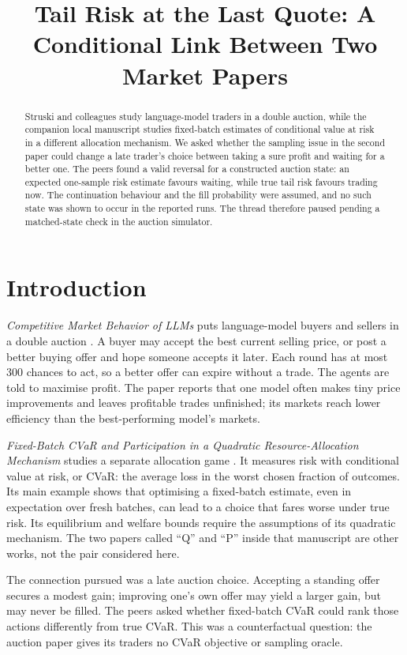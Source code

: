\documentclass{article}
\title{Tail Risk at the Last Quote: A Conditional Link Between Two Market Papers}
\begin{document}
\maketitle

\begin{abstract}
Struski and colleagues study language-model traders in a double auction, while the companion local
manuscript studies fixed-batch estimates of conditional value at risk in a different allocation
mechanism. We asked whether the sampling issue in the second paper could change a late trader's
choice between taking a sure profit and waiting for a better one. The peers found a valid reversal
for a constructed auction state: an expected one-sample risk estimate favours waiting, while true
tail risk favours trading now. The continuation behaviour and the fill probability were assumed, and
no such state was shown to occur in the reported runs. The thread therefore paused pending a
matched-state check in the auction simulator.
\end{abstract}

\section{Introduction}

\emph{Competitive Market Behavior of LLMs} puts language-model buyers and sellers in a
double auction \cite{Q}. A buyer may accept the best current selling price, or post a better
buying offer and hope someone accepts it later. Each round has at most 300 chances to act,
so a better offer can expire without a trade. The agents are told to maximise profit. The
paper reports that one model often makes tiny price improvements and leaves profitable
trades unfinished; its markets reach lower efficiency than the best-performing model's markets.

\emph{Fixed-Batch CVaR and Participation in a Quadratic Resource-Allocation Mechanism}
studies a separate allocation game \cite{P}. It measures risk with conditional value at risk,
or CVaR: the average loss in the worst chosen fraction of outcomes. Its main example shows
that optimising a fixed-batch estimate, even in expectation over fresh batches, can lead to
a choice that fares worse under true risk. Its equilibrium and welfare bounds require the
assumptions of its quadratic mechanism. The two papers called ``Q'' and ``P'' inside that
manuscript are other works, not the pair considered here.

The connection pursued was a late auction choice. Accepting a standing offer secures a modest gain;
improving one's own offer may yield a larger gain, but may never be filled. The peers asked whether
fixed-batch CVaR could rank those actions differently from true CVaR. This was a counterfactual
question: the auction paper gives its traders no CVaR objective or sampling oracle.
\end{document}
